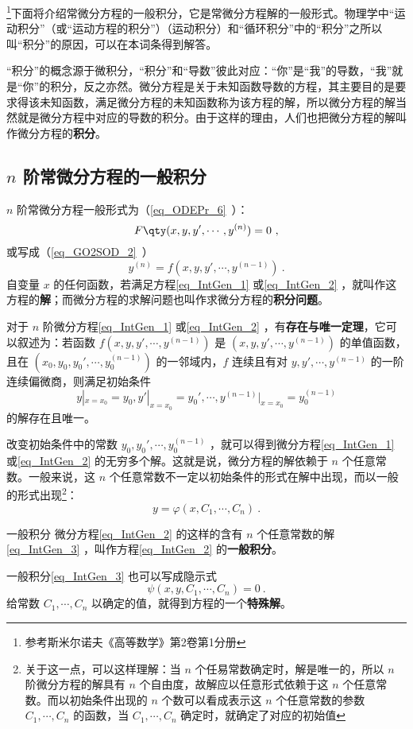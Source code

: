 \footnote{参考斯米尔诺夫《高等数学》第2卷第1分册}下面将介绍常微分方程的一般积分，它是常微分方程解的一般形式。物理学中“运动积分”（或“运动方程的积分”）（运动积分）和“循环积分”中的“积分”之所以叫“积分”的原因，可以在本词条得到解答。

“积分”的概念源于微积分，“积分”和“导数”彼此对应：“你”是“我”的导数，“我”就是“你”的积分，反之亦然。微分方程是关于未知函数导数的方程，其主要目的是要求得该未知函数，满足微分方程的未知函数称为该方程的解，所以微分方程的解当然就是微分方程中对应的导数的积分。由于这样的理由，人们也把微分方程的解叫作微分方程的\textbf{积分}。
\subsection{$n$ 阶常微分方程的一般积分}
$n$ 阶常微分方程一般形式为（\autoref{eq_ODEPr_6}~）：
\begin{equation}\label{eq_IntGen_1}
F \qty(x,y,y',\cdots,y^{(n)}) =0~,
\end{equation}
或写成（\autoref{eq_GO2SOD_2}~）
\begin{equation}\label{eq_IntGen_2}
y^{(n)}=f(x,y,y',\cdots,y^{(n-1)})~.
\end{equation}
自变量 $x$ 的任何函数，若满足方程\autoref{eq_IntGen_1} 或\autoref{eq_IntGen_2} ，就叫作这方程的\textbf{解}；而微分方程的求解问题也叫作求微分方程的\textbf{积分问题}。

对于 $n$ 阶微分方程\autoref{eq_IntGen_1} 或\autoref{eq_IntGen_2} ，有\textbf{存在与唯一定理}，它可以叙述为：若函数 $f(x,y,y',\cdots,y^{(n-1)})$ 是 $(x,y,y',\cdots,y^{(n-1)})$ 的单值函数，且在 $(x_0,y_0,y_0',\cdots,y_0^{(n-1)})$ 的一邻域内，$f$ 连续且有对 $y,y',\cdots,y^{(n-1)}$ 的一阶连续偏微商，则满足初始条件
\begin{equation}\label{eq_IntGen_5}
y|_{x=x_0}=y_0,y'|_{x=x_0}=y_0',\cdots,y^{(n-1)}|_{x=x_0}=y_0^{(n-1)}
\end{equation}
的解存在且唯一。

改变初始条件中的常数 $y_0,y_0',\cdots,y_0^{(n-1)}$ ，就可以得到微分方程\autoref{eq_IntGen_1} 或\autoref{eq_IntGen_2} 的无穷多个解。这就是说，微分方程的解依赖于 $n$ 个任意常数。一般来说，这 $n$ 个任意常数不一定以初始条件的形式在解中出现，而以一般的形式出现\footnote{关于这一点，可以这样理解：当 $n$ 个任易常数确定时，解是唯一的，所以 $n$ 阶微分方程的解具有 $n$ 个自由度，故解应以任意形式依赖于这 $n$ 个任意常数。而以初始条件出现的 $n$ 个数可以看成表示这 $n$ 个任意常数的参数 $C_1,\cdots,C_n$ 的函数，当 $C_1,\cdots,C_n$ 确定时，就确定了对应的初始值}：
\begin{equation}\label{eq_IntGen_3}
y=\varphi(x,C_1,\cdots,C_n)~.
\end{equation}
\begin{definition}{一般积分}
微分方程\autoref{eq_IntGen_2} 的这样的含有 $n$ 个任意常数的解\autoref{eq_IntGen_3} ，叫作方程\autoref{eq_IntGen_2} 的\textbf{一般积分}。
\end{definition}
一般积分\autoref{eq_IntGen_3} 也可以写成隐示式
\begin{equation}\label{eq_IntGen_4}
\psi(x,y,C_1,\cdots,C_n)=0~.
\end{equation}
给常数 $C_1,\cdots,C_n$ 以确定的值，就得到方程的一个\textbf{特殊解}。

